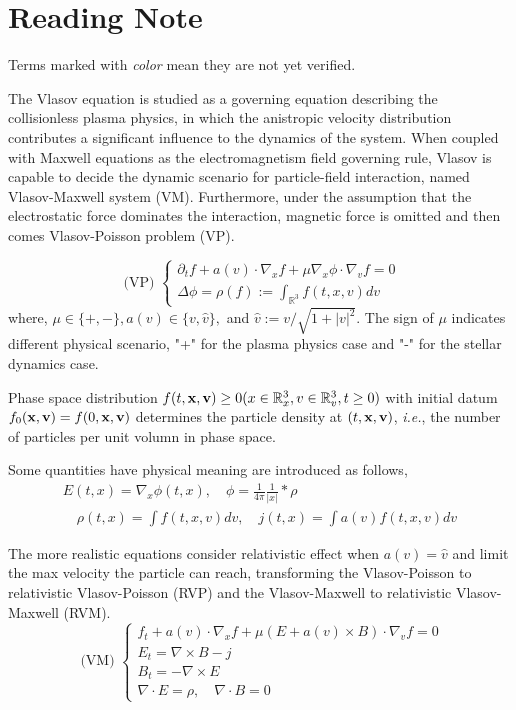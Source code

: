 \chapter*{Reading Note}
Terms marked with \emph{color} mean they are not yet verified.

The Vlasov equation is studied as a governing equation describing the collisionless plasma physics, 
in which the anistropic velocity distribution contributes a significant influence to the dynamics of the system. When coupled with Maxwell equations as the electromagnetism field governing rule, Vlasov is capable to decide the dynamic 
scenario for particle-field interaction, named Vlasov-Maxwell system (VM). Furthermore, under the assumption that the electrostatic force dominates the interaction, magnetic force is omitted and then comes Vlasov-Poisson problem (VP).

\begin{equation}\text { (VP) }\left\{\begin{array}{l}
    \partial_{t} f+a(v) \cdot \nabla_{x} f+\mu \nabla_{x} \phi \cdot \nabla_{v} f=0 \\
    \Delta \phi=\rho(f):=\int_{\mathbb{R}^{3}} f(t, x, v) d v
\end{array}\right.\end{equation}
where, $\mu \in\{+,-\}, a(v) \in\{v, \hat{v}\},$ and $\hat{v}:=v / \sqrt{1+|v|^{2}}$. The sign of $\mu$ indicates different physical scenario, "+" for the plasma physics case and "-" for the stellar dynamics case.

Phase space distribution $f(t, \mathbf{x}, \mathbf{v})\geq 0 (x\in {\mathbb{R}}_{x}^{3},v\in{\mathbb{R}}_{v}^{3},t\geq 0) $ with initial datum $f_{0}(\mathbf{x}, \mathbf{v})=f(0, \mathbf{x}, \mathbf{v})$ determines the particle density at $(t, \mathbf{x},\mathbf{v})$, \textit{i.e.}, the number of particles per unit volumn in phase space.

Some quantities have physical meaning are introduced as follows,
\begin{equation}\begin{array}{c}
    E(t, x)=\nabla_{x} \phi(t, x), \quad \phi=\frac{1}{4 \pi} \frac{1}{|x|} *\rho \\
    \quad \rho(t, x)=\int f(t, x, v) d v, \quad j(t, x)=\int a(v)f(t, x, v) d v
\end{array}\end{equation}

The more realistic equations consider relativistic effect when $a(v)=\hat{v}$ and limit the max velocity the particle can reach, transforming the Vlasov-Poisson to relativistic Vlasov-Poisson (RVP) and the Vlasov-Maxwell to relativistic Vlasov-Maxwell (RVM).
\begin{equation}\label{eq:rvm}\text { (VM) }\left\{\begin{array}{l}
f_{t}+a(v) \cdot \nabla_{x} f+\mu(E+a(v) \times B) \cdot \nabla_{v} f=0 \\
E_{t}=\nabla \times B-j \\
B_{t}=-\nabla \times E \\
\nabla \cdot E=\rho, \quad \nabla \cdot B=0
\end{array}\right.\end{equation}
\\
\\

